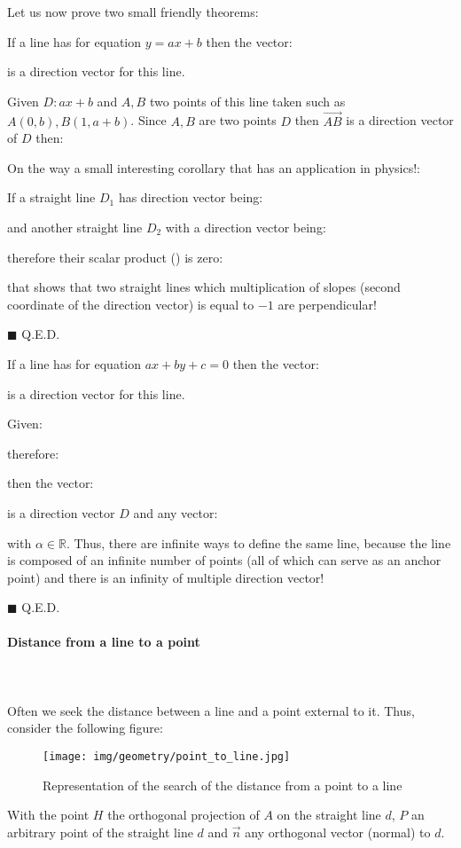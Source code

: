 	Let us now prove two small friendly theorems:
	\begin{theorem}
	If a line has for equation $y=ax+b$ then the vector:
	
	is a direction vector for this line.
	\end{theorem}
	\begin{dem}
	Given $D:ax+b$ and $A, B$ two points of this line taken such as ${A(0,b),B(1,a+b)}$. Since $A, B$ are two points $D$ then $\overrightarrow{AB}$ is a direction vector of $D$ then:
	
	On the way a small interesting corollary that has an application in physics!:
	
	If a straight line $D_1$ has direction vector being:
	
	and another straight line $D_2$ with a direction vector being:
	
	therefore their scalar product () is zero:
	
	that shows that two straight lines which multiplication of slopes (second coordinate of the direction vector) is equal to $-1$ are perpendicular!
	\begin{flushright}
		$\blacksquare$  Q.E.D.
	\end{flushright}
	\end{dem}
	\begin{theorem}
	If a line has for equation $ax+by+c=0$ then the vector:
	
	is a direction vector for this line.
	\end{theorem}
	\begin{dem}
	Given:
	
	therefore:
	
	then the vector:
	
	is a direction vector $D$ and any vector:
	
	with $\alpha\in \mathbb{R}$.
	Thus, there are infinite ways to define the same line, because the line is composed of an infinite number of points (all of which can serve as an anchor point) and there is an infinity of multiple direction vector!
	\begin{flushright}
		$\blacksquare$  Q.E.D.
	\end{flushright}
	\end{dem}
	
	\pagebreak
	\paragraph{Distance from a line to a point}\mbox{}\\\\
	Often we seek the distance between a line and a point external to it. Thus, consider the following figure:
	\begin{figure}[H]
		\centering
		\texttt{[image: img/geometry/point\_to\_line.jpg]}
		\caption{Representation of the search of the distance from a point to a line}
	\end{figure}
	With the point $H$ the orthogonal projection of $A$ on the straight line $d$, $P$ an arbitrary point of the straight line $d$ and $\vec{n}$ any orthogonal vector (normal) to $d$.
	
